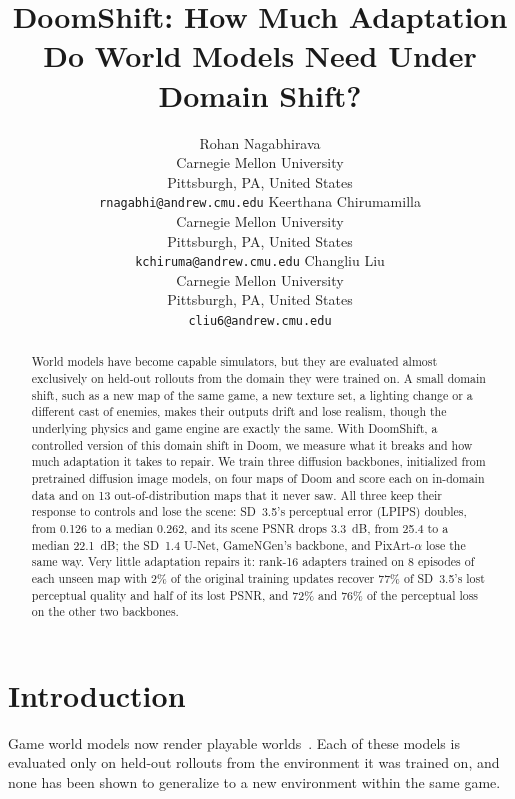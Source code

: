 \documentclass{article}
\title{DoomShift: How Much Adaptation Do World Models Need Under Domain Shift?}
\author{
  Rohan Nagabhirava\\
  Carnegie Mellon University\\
  Pittsburgh, PA, United States\\
  \texttt{rnagabhi@andrew.cmu.edu}
  \And
  Keerthana Chirumamilla\\
  Carnegie Mellon University\\
  Pittsburgh, PA, United States\\
  \texttt{kchiruma@andrew.cmu.edu}
  \And
  Changliu Liu\\
  Carnegie Mellon University\\
  Pittsburgh, PA, United States\\
  \texttt{cliu6@andrew.cmu.edu}
}
\begin{document}
\raggedbottom
\setlength{\textfloatsep}{12pt plus 2pt minus 4pt}
\maketitle


\begin{abstract}
World models have become capable simulators, but they are evaluated almost exclusively on held-out rollouts from the domain they were trained on.
A small domain shift, such as a new map of the same game, a new texture set, a lighting change or a different cast of enemies, makes their outputs drift and lose realism, though the underlying physics and game engine are exactly the same.
With DoomShift, a controlled version of this domain shift in Doom, we measure what it breaks and how much adaptation it takes to repair.
We train three diffusion backbones, initialized from pretrained diffusion image models, on four maps of Doom and score each on in-domain data and on 13 out-of-distribution maps that it never saw.
All three keep their response to controls and lose the scene: SD~3.5's perceptual error (LPIPS) doubles, from 0.126 to a median 0.262, and its scene PSNR drops 3.3~dB, from 25.4 to a median 22.1~dB; the SD~1.4 U-Net, GameNGen's backbone, and PixArt-$\alpha$ lose the same way.
Very little adaptation repairs it: rank-16 adapters trained on 8 episodes of each unseen map with 2\% of the original training updates recover 77\% of SD~3.5's lost perceptual quality and half of its lost PSNR, and 72\% and 76\% of the perceptual loss on the other two backbones.
\end{abstract}



\section{Introduction}
\label{sec:intro}

Game world models now render playable worlds~\citep{valevski2024gamengen,alonso2024diamond,bruce2024genie}.
Each of these models is evaluated only on held-out rollouts from the environment it was trained on, and none has been shown to generalize to a new environment within the same game.
\end{document}
